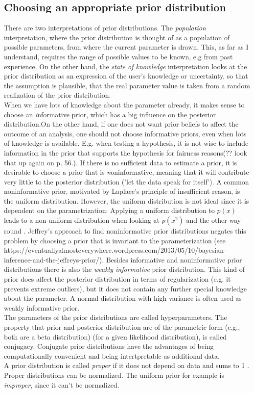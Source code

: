 \documentclass{article}
\begin{document}
\subsection{Choosing an appropriate prior distribution}
There are two interpretations of prior distributions. The \textit{population} interpretation, where the prior distribution is thought of as a population of possible parameters, from where the current parameter is drawn. This, as far as I understand, requires the range of possible values to be known, e.g from past experience. On the other hand, the \textit{state of knowledge} interpretation looks at the prior distribution as an expression of the user's knowledge or uncertainty, so that the assumption is plausible, that the real parameter value is taken from a random realization of the prior distribution.
\\
When we have lots of knowledge about the parameter already, it makes sense to choose an \textit informative prior, which has a big influence on the posterior distribution.On the other hand, if one does not want prior beliefs to affect the outcome of an analysis, one should not choose informative priors, even when lots of knowledge is available. E.g. when testing a hypothesis, it is not wise to include information in the prior that supports the hypothesis for fairness reasons(?? look that up again on p. 56.). If there is no sufficient data to estimate a prior, it is desirable to choose a prior that is \textit noninformative, meaning that it will contribute very little to the posterior distribution ('let the data speak for itself'). A common noninformative prior, motivated by Laplace's principle of insufficient reason, is the uniform distribution. However, the uniform distribution is not ideal since it is dependent on the parametrization: Applying a uniform distribution to $p(x)$ leads to a non-uniform distribution when looking at $p(x^2)$ and the other way round \cite{1439840954}. Jeffrey's approach to find noninformative prior distributions negates this problem by choosing a prior that is invariant to the parameterization (see https://eventuallyalmosteverywhere.wordpress.com/2013/05/10/bayesian-inference-and-the-jeffreys-prior/).
Besides informative and noninformative prior distributions there is also the \textit {weakly informative} prior distribution. This kind of prior does affect the posterior distribution in terms of regularization (e.g. it prevents extreme outliers), but it does not contain any further special knowledge about the parameter. A normal distribution with high variance is often used as weakly informative prior.
\\
The parameters of the prior distributions are called hyperparameters. The property that prior and posterior distribution are of the parametric form (e.g., both are a beta distribution) (for a given likelihood distribution), is called conjugacy. Conjugate prior distributions have the advantages of being computationally convenient and being intertpretable as additional data.
\\
A prior distribution is called \textit{proper} if it does not depend on data and sums to 1 \cite{1439840954}. Proper distributions can be normalized. The uniform prior for example is \textit{improper}, since it can't be normalized.
\end{document}
